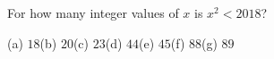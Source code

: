 For how many integer values of $x$ is $x^2<2018$?

(a) $18$\quad (b) $20$\quad (c) $23$\quad (d) $44$\quad (e) $45$\quad (f) $88$\quad (g) $89$
